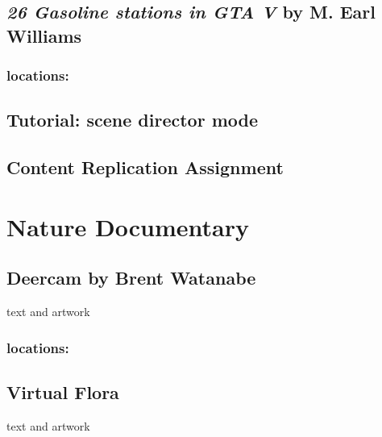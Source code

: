 \documentclass[
  openany]{book}
\begin{document}
\hypertarget{gasoline-stations-in-gta-v-by-m.-earl-williams}{%
\section{\texorpdfstring{\emph{26 Gasoline stations in GTA V} by M. Earl Williams}{26 Gasoline stations in GTA V by M. Earl Williams}}\label{gasoline-stations-in-gta-v-by-m.-earl-williams}}

\hypertarget{locations}{%
\subsection{locations:}\label{locations}}

\hypertarget{tutorial-scene-director-mode}{%
\section{Tutorial: scene director mode}\label{tutorial-scene-director-mode}}

\hypertarget{content-replication-assignment-2}{%
\section{Content Replication Assignment}\label{content-replication-assignment-2}}

\hypertarget{nature-documentary}{%
\chapter{Nature Documentary}\label{nature-documentary}}

\hypertarget{deercam-by-brent-watanabe}{%
\section{Deercam by Brent Watanabe}\label{deercam-by-brent-watanabe}}

text and artwork

\hypertarget{locations-1}{%
\subsection{locations:}\label{locations-1}}

\hypertarget{virtual-flora}{%
\section{Virtual Flora}\label{virtual-flora}}

text and artwork
\end{document}
